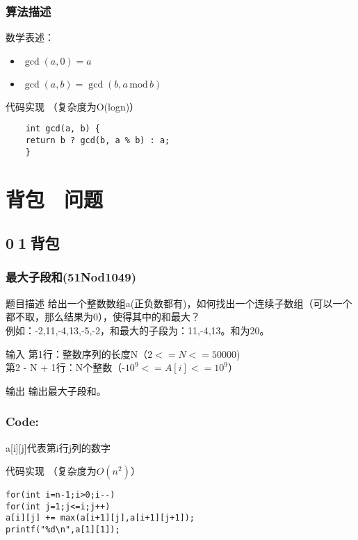 \documentclass{beamer}
\begin{document}
\begin{frame}[fragile]
\frametitle{算法描述}
数学表述：
\begin{itemize}
	\item ${\displaystyle \gcd(a,0)=a}$
	\item ${\displaystyle \gcd(a,b)=\gcd(b,a\,\mathrm {mod} \,b)} $
\end{itemize}
\begin{block}{代码实现  （复杂度为O(logn)）}
	\begin{lstlisting}
	int gcd(a, b) {
	return b ? gcd(b, a % b) : a;
	}
	\end{lstlisting}
\end{block}
\end{frame}



\section{背包$\quad$问题}

\subsection{0$\;$1$\;$背包}
\begin{frame}
\frametitle{最大子段和(51Nod1049)}
\begin{block}{题目描述}
	给出一个整数数组a(正负数都有)，如何找出一个连续子数组（可以一个都不取，那么结果为0），使得其中的和最大？\\
	例如：-2,11,-4,13,-5,-2，和最大的子段为：11,-4,13。和为20。
\end{block}
\begin{block}{输入}
	第1行：整数序列的长度N（2$ <= N <= 50000$)\\
	第2 - N + 1行：N个整数（-$10^9 <= A[i] <= 10^9$）
\end{block}	
\begin{block}{输出}
	输出最大子段和。
\end{block}

\end{frame}

\begin{frame}[fragile]
\frametitle{Code:}
a[i][j]代表第i行j列的数字
\begin{block}{代码实现  （复杂度为$O(n^2)$）}
\begin{lstlisting}
for(int i=n-1;i>0;i--)
for(int j=1;j<=i;j++)
a[i][j] += max(a[i+1][j],a[i+1][j+1]);
printf("%d\n",a[1][1]);
\end{lstlisting}
\end{block}
\end{frame}
\end{document}
